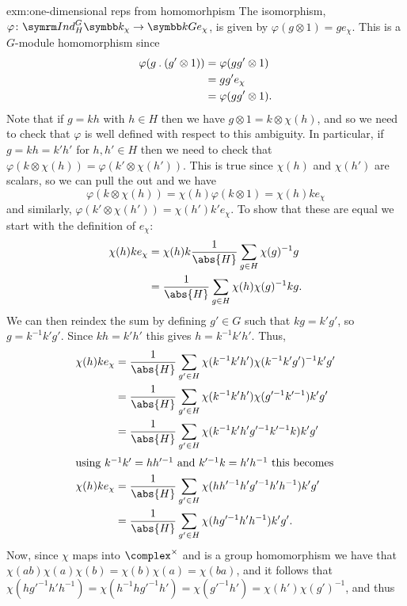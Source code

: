 \begin{exm}{}{exm:one-dimensional reps from homomorhpism}
    The isomorphism, \(\varphi \colon \Ind^G_H \field_{\chi} \to \field G e_\chi\), is given by \(\varphi(g \otimes 1) = ge_\chi\).
    This is a \(G\)-module homomorphism since
    \begin{align}
        \varphi(g \mathbin{.} (g' \otimes 1)) &= \varphi(gg' \otimes 1)\\
        &= gg'e_\chi\\
        &= \varphi(gg' \otimes 1).
    \end{align}
    Note that if \(g = kh\) with \(h \in H\) then we have \(g \otimes 1 = k \otimes \chi(h)\), and so we need to check that \(\varphi\) is well defined with respect to this ambiguity.
    In particular, if \(g = kh = k'h'\) for \(h, h' \in H\) then we need to check that \(\varphi(k \otimes \chi(h)) = \varphi(k' \otimes \chi(h'))\).
    This is true since \(\chi(h)\) and \(\chi(h')\) are scalars, so we can pull the out and we have
    \begin{equation}
        \varphi(k \otimes \chi(h)) = \chi(h)\varphi(k \otimes 1) = \chi(h) ke_\chi
    \end{equation}
    and similarly, \(\varphi(k' \otimes \chi(h')) = \chi(h')k' e_\chi\).
    To show that these are equal we start with the definition of \(e_\chi\):
    \begin{align}
        \chi(h)ke_\chi &= \chi(h)k \frac{1}{\abs{H}} \sum_{g \in H} \chi(g)^{-1}g\\
        &= \frac{1}{\abs{H}} \sum_{g \in H} \chi(h)\chi(g)^{-1} kg.
    \end{align}
    We can then reindex the sum by defining \(g' \in G\) such that \(kg = k'g'\), so \(g = k^{-1}k'g'\).
    Since \(kh = k'h'\) this gives \(h = k^{-1}k'h'\).
    Thus,
    \begin{align}
        \chi(h)ke_\chi &= \frac{1}{\abs{H}} \sum_{g' \in H} \chi(k^{-1}k'h')\chi(k^{-1}k'g')^{-1} k'g'\\
        &= \frac{1}{\abs{H}} \sum_{g' \in H} \chi(k^{-1}k'h')\chi(g'^{-1}k'^{-1}) k'g'\\
        &= \frac{1}{\abs{H}} \sum_{g' \in H} \chi(k^{-1}k'h' g'^{-1}k'^{-1}k) k'g'\\
        \shortintertext{using \(k^{-1}k' = hh'^{-1}\) and \(k'^{-1}k = h'h^{-1}\) this becomes}
        \chi(h)ke_\chi &= \frac{1}{\abs{H}} \sum_{g' \in H} \chi(hh'^{-1} h' g'^{-1}h'h^{-1}) k'g'\\
        &= \frac{1}{\abs{H}} \sum_{g' \in H} \chi(h g'^{-1}h'h^{-1}) k'g'.
    \end{align}
    Now, since \(\chi\) maps into \(\complex^{\times}\) and is a group homomorphism we have that \(\chi(ab) \chi(a)\chi(b) = \chi(b)\chi(a) = \chi(ba)\), and it follows that \(\chi(hg'^{-1}h'h^{-1}) = \chi(h^{-1}hg'^{-1}h') = \chi(g'^{-1}h') = \chi(h')\chi(g')^{-1}\), and thus

\end{exm}
